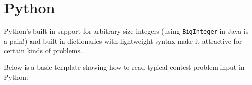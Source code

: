 \documentclass[10pt]{book}
\newcommand{\pycode}[1]{\inputminted[fontsize=\normalsize]{python}{code/#1}}
\newif\iftodos
\newcommand{\todo}[1]{\iftodos\textcolor{red}{[TODO: #1]}\fi}
\begin{document}
\chapter{Python} \label{chap:python}

Python's built-in support for arbitrary-size integers (using
\texttt{BigInteger} in Java is a pain!) and built-in dictionaries with
lightweight syntax make it attractive for certain kinds of problems.

Below is a basic template showing how to read typical contest problem
input in Python:

\pycode{python/template.py}

\todo{Mention basic Python data structures such as set, deque, list methods}
\end{document}
